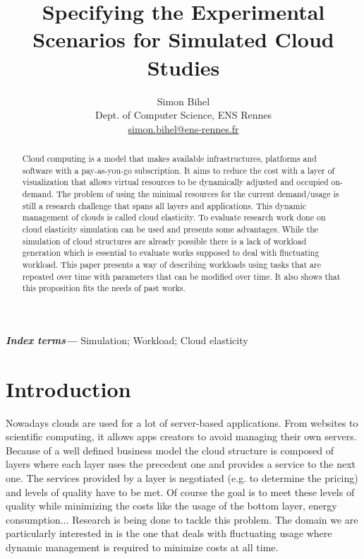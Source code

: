 \documentclass[a4paper, onecolumn, 11pt]{article}
\title{Specifying the Experimental Scenarios for Simulated Cloud Studies}
\author{Simon Bihel \\ Dept. of Computer Science, ENS Rennes\\
  \href{mailto:simon.bihel@ens-rennes.fr}{simon.bihel@ens-rennes.fr}}
\begin{document}
\maketitle

\begin{abstract}
  Cloud computing is a model that makes available infrastructures, platforms and
  software with a pay-as-you-go subscription. It aims to reduce the cost with a
  layer of visualization that allows virtual resources to be dynamically
  adjusted and occupied on-demand. The problem of using the minimal resources
  for the current demand/usage is still a research challenge that spans all
  layers and applications. This dynamic management of clouds is called cloud
  elasticity. To evaluate research work done on cloud elasticity simulation can 
  be used and presents some advantages. While the simulation of cloud 
  structures are already possible there is a lack of workload generation which 
  is essential to evaluate works supposed to deal with fluctuating workload. 
  This paper presents a way of describing workloads using tasks that are 
  repeated over time with parameters that can be modified over time. It also 
  shows that this proposition fits the needs of past works.
\end{abstract}

\providecommand{\keywords}[1]{\textbf{\textit{Index terms---}} #1}
\keywords{Simulation; Workload; Cloud elasticity}

\section{Introduction} \label{intro}
  Nowadays clouds are used for a lot of server-based applications. From websites
  to scientific computing, it allows apps creators to avoid managing their own
  servers. Because of a well defined business model the cloud structure is
  composed of layers where each layer uses the precedent one and provides a
  service to the next one. The services provided by a layer is negotiated (e.g.
  to determine the pricing) and levels of quality have to be met. Of course the
  goal is to meet these levels of quality while minimizing the costs like the
  usage of the bottom layer, energy consumption... Research is being done to
  tackle this problem. The domain we are particularly interested in is the one
  that deals with fluctuating usage where dynamic management is required to
  minimize costs at all time.
  
\end{document}
